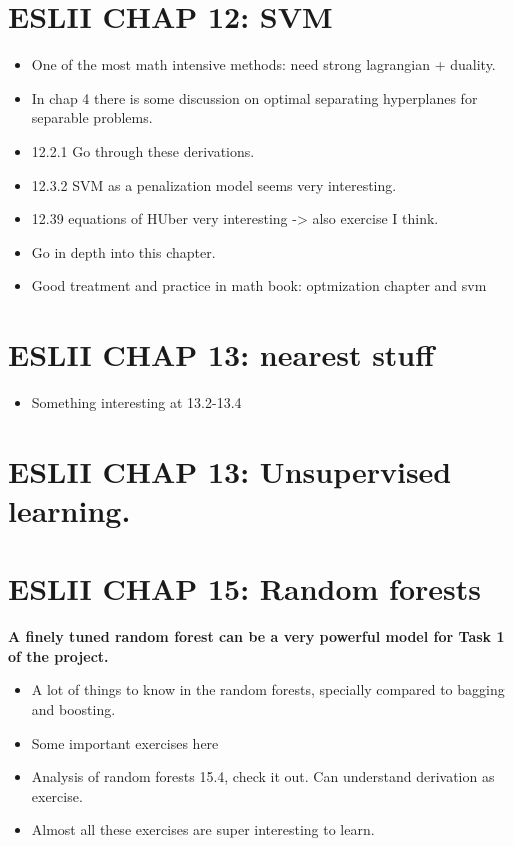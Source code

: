 \documentclass{article}
\begin{document}
\section{ESLII CHAP 12: SVM}
\begin{itemize}
    \item One of the most math intensive methods: need strong lagrangian + duality.
    \item In chap 4 there is some discussion on optimal separating hyperplanes for separable problems.
    \item 12.2.1 Go through these derivations.
    \item 12.3.2 SVM as a penalization model seems very interesting.
    \item 12.39 equations of HUber very interesting -> also exercise I think.
    \item Go in depth into this chapter.
    \item Good treatment and practice in math book: optmization chapter and svm
\end{itemize}

\section{ESLII CHAP 13: nearest stuff}
\begin{itemize}
    \item Something interesting at 13.2-13.4
\end{itemize}

\section{ESLII CHAP 13: Unsupervised learning.}

\section{ESLII CHAP 15: Random forests}
\textbf{A finely tuned random forest can be a very powerful model for Task 1 of the project.} 
\begin{itemize}
    \item A lot of things to know in the random forests, specially compared to bagging and boosting. 
    \item Some important exercises here
    \item Analysis of random forests 15.4, check it out. Can understand derivation as exercise.
    \item Almost all these exercises are super interesting to learn.
\end{itemize}
\end{document}
